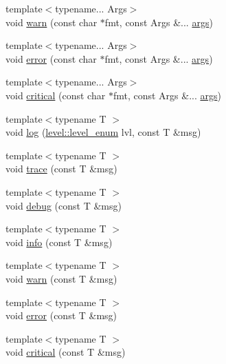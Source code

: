 \begin{DoxyCompactItemize}
\item 
{\footnotesize template$<$typename... Args$>$ }\\void \hyperlink{namespacespdlog_a41a6d93dee0e1a8c2e6153c1fc7f59df}{warn} (const char $\ast$fmt, const Args \&... \hyperlink{printf_8h_a47047b7b28fd1342eef756b79c778580}{args})
\item 
{\footnotesize template$<$typename... Args$>$ }\\void \hyperlink{namespacespdlog_a84fc1d0e60ec7d333fd4f299f9c1e6b2}{error} (const char $\ast$fmt, const Args \&... \hyperlink{printf_8h_a47047b7b28fd1342eef756b79c778580}{args})
\item 
{\footnotesize template$<$typename... Args$>$ }\\void \hyperlink{namespacespdlog_a753989ee0011b7d977e04a278b9380a2}{critical} (const char $\ast$fmt, const Args \&... \hyperlink{printf_8h_a47047b7b28fd1342eef756b79c778580}{args})
\item 
{\footnotesize template$<$typename T $>$ }\\void \hyperlink{namespacespdlog_aee9d401c7cb3cd8538a139af836c5ec5}{log} (\hyperlink{namespacespdlog_1_1level_a35f5227e5daf228d28a207b7b2aefc8b}{level\+::level\+\_\+enum} lvl, const T \&msg)
\item 
{\footnotesize template$<$typename T $>$ }\\void \hyperlink{namespacespdlog_a99302a3f872e2cba98f81ac1a2f63321}{trace} (const T \&msg)
\item 
{\footnotesize template$<$typename T $>$ }\\void \hyperlink{namespacespdlog_a93c284cebdb3b3dab204f2a87344e4b5}{debug} (const T \&msg)
\item 
{\footnotesize template$<$typename T $>$ }\\void \hyperlink{namespacespdlog_ad68b6f9b65e1e8daab0117d75f0c39b4}{info} (const T \&msg)
\item 
{\footnotesize template$<$typename T $>$ }\\void \hyperlink{namespacespdlog_ab3df0dca3174a057e99fc327e8c25c57}{warn} (const T \&msg)
\item 
{\footnotesize template$<$typename T $>$ }\\void \hyperlink{namespacespdlog_aa274f8a5f4f20ff435d27500ff589234}{error} (const T \&msg)
\item 
{\footnotesize template$<$typename T $>$ }\\void \hyperlink{namespacespdlog_a2c707fb3d3d12a244ebfe3e40b417edc}{critical} (const T \&msg)
\end{DoxyCompactItemize}


